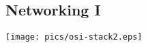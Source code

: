 \documentclass[xga]{xdvislides}
\begin{document}
\subsection{Networking I}
\vspace*{\fill}
\begin{center}
	\texttt{[image: pics/osi-stack2.eps]}
\end{center}
\vspace*{\fill}



\end{document}

